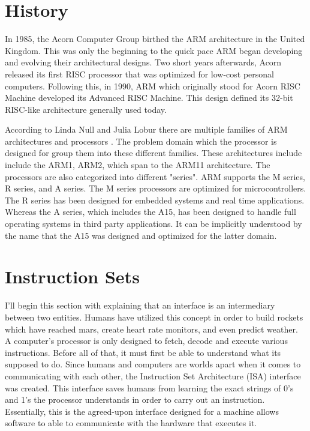 \documentclass[12pt]{scrreprt}
\begin{document}
\tableofcontents

\chapter{History}

	In 1985, the Acorn Computer Group birthed the ARM architecture in the United Kingdom. This was only the beginning to
	the quick pace ARM began developing and evolving their architectural designs. Two short years afterwards, Acorn 
	released its first RISC processor that was optimized for low-cost personal computers. Following this, in 1990, ARM 
	which originally stood for Acorn RISC Machine developed its Advanced RISC Machine. This design defined its 32-bit RISC-like
	architecture generally used today.

	According to Linda Null and Julia Lobur there are multiple families of ARM architectures and processors \autocite[327]{classtext}.
	The problem domain which the processor is designed for group them into these different families. 
	These architectures include include the ARM1, ARM2, which span to the ARM11 architecture.
	The processors are also categorized into different "series".
	ARM supports the M series, R series, and A series.
	The M series processors are optimized for microcontrollers. 
	The R series has been designed for embedded systems and real time applications.
	Whereas the A series, which includes the A15, has been designed to handle full operating systems in third party applications. 
	It can be implicitly understood by the name that the A15 was designed and optimized for the latter domain.

{\let\clearpage\relax\chapter{Instruction Sets}}

	I'll begin this section with explaining that an interface is an intermediary between two entities.
	Humans have utilized this concept in order to build rockets which have reached mars, create heart rate monitors, and even predict weather. 
	A computer's processor is only designed to fetch, decode and execute various instructions.
	Before all of that, it must first be able to understand what its supposed to do.
	Since humans and computers are worlds apart when it comes to communicating with each other, the Instruction Set Architecture (ISA) interface was created.
	This interface saves humans from learning the exact strings of 0's and 1's the processor understands in order to carry out an instruction.
	Essentially, this is the agreed-upon interface designed for a machine allows software to able to communicate with the hardware that executes it\autocite[233]{classtext}.
\end{document}
